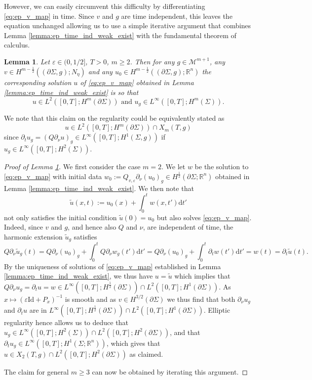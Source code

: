 \documentclass[10pt,reqno]{amsart}
\theoremstyle{plain}
\newtheorem{lemma}{Lemma}[section]
\theoremstyle{definition}
\newcommand{\pnu}{\partial_\nu}
\numberwithin{equation}{section}
\newcommand{\Si}{\Sigma}
\newcommand{\ep}{\varepsilon}
\newcommand{\R}{\ensuremath{{\mathbb R}}}
\newcommand{\dd}{\mathrm{d}} %
\newcommand{\Id}{\text{Id}}
\newcommand{\pt}{\partial_t}
\newcommand{\eps}{\varepsilon}
\newcommand{\pSi}{{\partial \Sigma}}
\newcommand{\MM}{\mathcal{M}} %
\newcommand{\hf}{\frac{1}{2}} %
\newcommand{\p}{\partial} %
\begin{document}
However, we can easily circumvent this difficulty by  differentiating \eqref{eq:ep_v_map} in time. Since $v$ and $g$ are time independent, this leaves the equation unchanged allowing us to use a simple iterative argument that combines Lemma \ref{lemma:ep_time_ind_weak_exist} with the fundamental theorem of calculus. 

\begin{lemma}\label{lemma:ep_new_sol}
    Let $\ep\in (0, 1/2]$, $T>0$, $m\geq 2$. Then for any $g \in \MM^{m+1}$, any $v\in H^{m-\hf}((\p\Si,g);N_\eta )$ and any $u_0 \in H^{m-\hf}((\p\Si,g);\R^n)$ the corresponding solution $u$ of \eqref{eq:ep_v_map} obtained in Lemma \ref{lemma:ep_time_ind_weak_exist} is so that 
    $$u\in  L^2([0,T];H^m(\p\Si)) \text{ and 
    } u_g\in  L^\infty([0,T];H^m(\Si)). %
    $$ 
\end{lemma}

We note that this claim on the regularity could be equivalently stated as 
$$u\in L^2([0,T];H^m(\p\Si))\cap X_m(T,g)$$
since $\pt u_g=(Q \pnu u)_g\in L^\infty([0,T];H^1(\Si,g))$ if $u_g\in  L^\infty([0,T];H^2(\Si))$.  

\begin{proof}[Proof of Lemma \ref{lemma:ep_new_sol}]
    We first consider the case $m=2$. We let $w$ be the solution to \eqref{eq:ep_v_map} with initial data $w_0:= Q_{v,\eps}\p_{\nu}(u_0)_{g}\in H^{\hf}(\p\Si;\R^n)$ obtained in Lemma \ref{lemma:ep_time_ind_weak_exist}.
    We then note that 
    \begin{equation*}
        \tilde{u}(x,t) := u_0(x) + \int_0^tw(x,t')\dd t'
    \end{equation*}
    not only satisfies the initial condition $\tilde{u}(0)=u_0$ but also solves \eqref{eq:ep_v_map}. Indeed, since $v$ and $g$, and hence also $Q$ and $\nu$, are independent of time, the harmonic extension $\tilde{u}_g$ satisfies
    \begin{equation*}
        Q\p_{\nu}\tilde{u}_g (t)=Q\p_{\nu}(u_0)_{g}+ \int_0^tQ\p_{\nu}w_g(t')\dd t' = Q\p_{\nu}(u_0)_g+\int_0^t\p_tw(t')\dd t'=w(t)=\p_t\tilde{u}(t).
    \end{equation*}
    By the uniqueness of solutions of \eqref{eq:ep_v_map} established in Lemma \ref{lemma:ep_time_ind_weak_exist}, we thus have $u=\tilde{u}$ which implies that $Q\p_{\nu}u_g=\p_tu=w\in L^\infty([0,T];H^{\hf}(\pSi))\cap L^2([0,T]; H^{1}(\pSi))$. As $x\mapsto (\eps \Id+P_{x})^{-1}$ is smooth and as $v\in H^{3/2}(\pSi)$ we thus find that both $\p_{\nu}u_g$ and $\pt u$ are in $L^\infty([0,T];H^{\frac12}(\pSi))\cap L^2([0,T]; H^{1}(\pSi))$. Elliptic regularity hence allows us to deduce that $u_g\in L^\infty([0,T];H^2(\Si))\cap L^2([0,T]; H^{2}(\pSi))$, and that $\p_t u_g\in L^\infty([0,T];H^1(\Si;\R^n))$, which gives that $u\in X_2(T,g)\cap L^2([0,T]; H^{2}(\pSi))$ as claimed. 
    
    The claim for general $m\geq 3$ can now be obtained by iterating this argument.
\end{proof}
\end{document}
